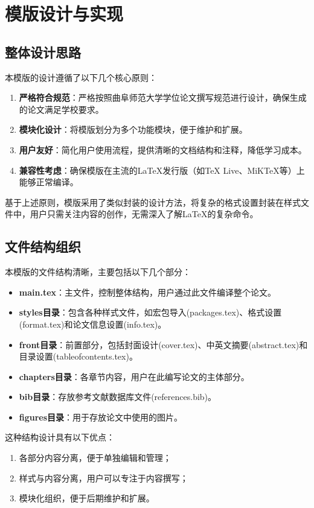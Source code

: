 \section{模版设计与实现}

\subsection{整体设计思路}
本模版的设计遵循了以下几个核心原则：

\begin{enumerate}
    \item \textbf{严格符合规范}：严格按照曲阜师范大学学位论文撰写规范进行设计，确保生成的论文满足学校要求。
    \item \textbf{模块化设计}：将模版划分为多个功能模块，便于维护和扩展。
    \item \textbf{用户友好}：简化用户使用流程，提供清晰的文档结构和注释，降低学习成本。
    \item \textbf{兼容性考虑}：确保模版在主流的\LaTeX{}发行版（如TeX Live、MiKTeX等）上能够正常编译。
\end{enumerate}

基于上述原则，模版采用了类似封装的设计方法，将复杂的格式设置封装在样式文件中，用户只需关注内容的创作，无需深入了解\LaTeX{}的复杂命令。

\subsection{文件结构组织}
本模版的文件结构清晰，主要包括以下几个部分：

\begin{itemize}
    \item \textbf{main.tex}：主文件，控制整体结构，用户通过此文件编译整个论文。
    \item \textbf{styles目录}：包含各种样式文件，如宏包导入(packages.tex)、格式设置(format.tex)和论文信息设置(info.tex)。
    \item \textbf{front目录}：前置部分，包括封面设计(cover.tex)、中英文摘要(abstract.tex)和目录设置(tableofcontents.tex)。
    \item \textbf{chapters目录}：各章节内容，用户在此编写论文的主体部分。
    \item \textbf{bib目录}：存放参考文献数据库文件(references.bib)。
    \item \textbf{figures目录}：用于存放论文中使用的图片。
\end{itemize}

这种结构设计具有以下优点：
\begin{enumerate}
    \item 各部分内容分离，便于单独编辑和管理；
    \item 样式与内容分离，用户可以专注于内容撰写；
    \item 模块化组织，便于后期维护和扩展。
\end{enumerate}


